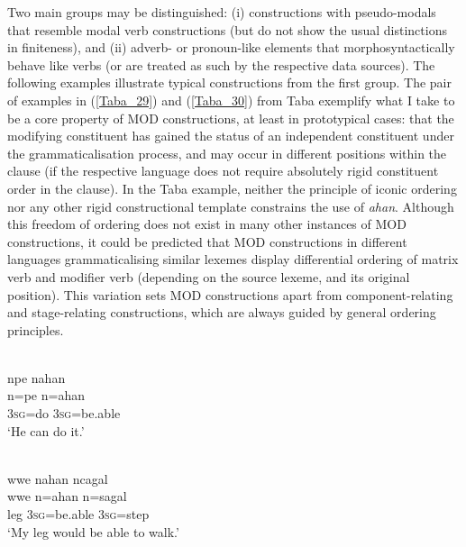 Two main groups may be distinguished: (i) constructions with pseudo-modals that resemble modal verb constructions (but do not show the usual distinctions in finiteness), and (ii) adverb- or pronoun-like elements that morphosyntactically behave like verbs (or are treated as such by the respective data sources). The following examples illustrate typical constructions from the first group. The pair of examples in (\ref{Taba_29}) and (\ref{Taba_30}) from Taba exemplify what I take to be a core property of MOD constructions, at least in prototypical cases: that the modifying constituent has gained the status of an independent constituent under the grammaticalisation process, and may occur in different positions within the clause (if the respective language does not require absolutely rigid constituent order in the clause). In the Taba example, neither the principle of iconic ordering nor any other rigid constructional template constrains the use of \textit{ahan}. Although this freedom of ordering does not exist in many other instances of MOD constructions, it could be predicted that MOD constructions in different languages grammaticalising similar lexemes display differential ordering of matrix verb and modifier verb (depending on the source lexeme, and its original position). This variation sets MOD constructions apart from component-relating and stage-relating constructions, which are always guided by general ordering principles.

\ea \label{Taba_29}
\\
\glll npe nahan \\
n=pe n=ahan \\
3\textsc{sg}=do 3\textsc{sg}=be.able \\
\glft `He can do it.'\\ 
\z

\ea \label{Taba_30}
\\
\glll wwe nahan ncagal \\
wwe n=ahan n=sagal \\
leg 3\textsc{sg}=be.able 3\textsc{sg}=step \\
\glft `My leg would be able to walk.'\\ 
\z

